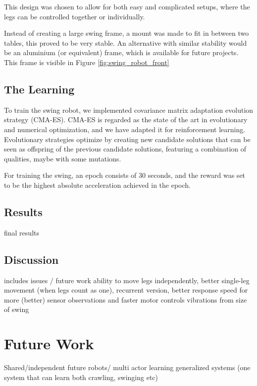 \documentclass[11pt, a4paper]{article}
\begin{document}
This design was chosen to allow for both easy and complicated setups, where the legs can be controlled together or individually.

Instead of creating a large swing frame, a mount was made to fit in between two tables, this proved to be very stable. An alternative with similar stability would be an aluminium (or equivalent) frame, which is available for future projects. This frame is visible in Figure \ref{fig:swing_robot_front}



\subsection{The Learning}
To train the swing robot, we implemented covariance matrix adaptation evolution strategy (CMA-ES). CMA-ES is regarded as the state of the art in evolutionary and numerical optimization, and we have adapted it for reinforcement learning. Evolutionary strategies optimize by creating new candidate solutions that can be seen as offspring of the previous candidate solutions, featuring a combination of qualities, maybe with some mutations.

For training the swing, an epoch consists of 30 seconds, and the reward was set to be the highest absolute acceleration achieved in the epoch.
\subsection{Results}
final results
\subsection{Discussion}
includes issues / future work
ability to move legs independently, better single-leg movement (when legs count as one), recurrent version, better response speed for more (better) sensor observations and faster motor controls
vibrations from size of swing
\section{Future Work}
Shared/independent
future robots/  multi actor learning
generalized systems (one system that can learn both crawling, swinging etc)
\end{document}
